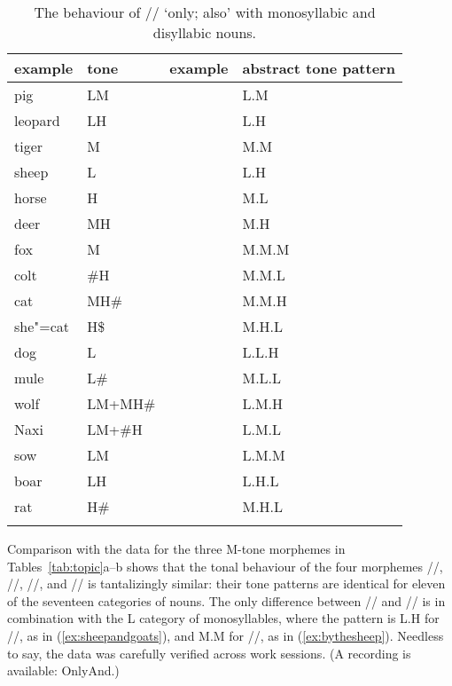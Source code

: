 \begin{table}%
	\caption{\label{tab:thebehaviourofonlyalsowithmonosyllabicanddisyllabicnouns}The behaviour of // ‘only; also’ with {monosyllabic} and disyllabic nouns.}
	\begin{tabularx}{\textwidth}{ Q Q P{30mm} l }
		\lsptoprule
		example & tone & example & abstract tone pattern\\ \midrule
		pig & LM &  & L.M\\
		leopard & LH &  & L.H\\
		tiger & M &  & M.M\\
		sheep & L &  & L.H\\
		horse & H &  & M.L\\
		deer & MH &  & M.H\\ \addlinespace \hdashline \addlinespace
		fox & M &  & M.M.M\\
		colt & \#H &  & M.M.L\\
		cat & MH\# &  & M.M.H\\
		she"=cat & H\$ &  & M.H.L\\
		dog & L &  & L.L.H\\
		mule & L\# &  & M.L.L\\
		wolf & LM+MH\# &  & L.M.H\\
		Naxi & LM+\#H &  & L.M.L\\
		sow & LM &  & L.M.M\\
		boar & LH &  & L.H.L\\
		rat & H\# &  & M.H.L\\
		\lspbottomrule
	\end{tabularx}
\end{table}

Comparison with the data for the three M-tone morphemes in Tables~\ref{tab:topic}a--b shows that the tonal behaviour of the four morphemes //, //, //, and // is tantalizingly similar: their tone patterns are identical for eleven of the seventeen
categories of nouns. The only difference between // and // is in combination with
the L category of monosyllables, where the pattern is L.H for //, as in (\ref{ex:sheepandgoats}), and M.M for //, as in (\ref{ex:bythesheep}). Needless to say, the data was carefully verified across work sessions. (A recording is available: OnlyAnd.)

